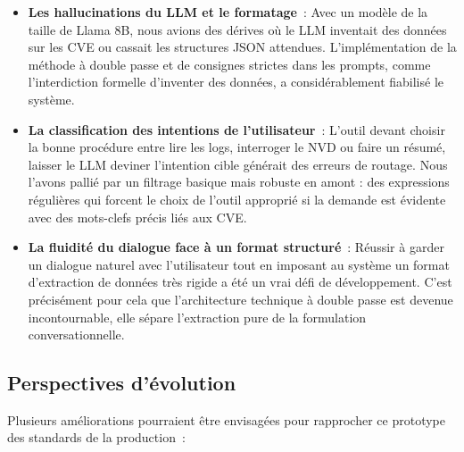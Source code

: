 \documentclass[runningheads]{llncs}
\begin{document}
\begin{itemize}
    \item \textbf{Les hallucinations du LLM et le formatage}~: Avec un modèle de la taille de Llama 8B, nous avions des dérives où le LLM inventait des données sur les CVE ou cassait les structures JSON attendues. L'implémentation de la méthode à double passe et de consignes strictes dans les prompts, comme l'interdiction formelle d'inventer des données, a considérablement fiabilisé le système.
    \item \textbf{La classification des intentions de l'utilisateur}~: L'outil devant choisir la bonne procédure entre lire les logs, interroger le NVD ou faire un résumé, laisser le LLM deviner l'intention cible générait des erreurs de routage. Nous l'avons pallié par un filtrage basique mais robuste en amont : des expressions régulières qui forcent le choix de l'outil approprié si la demande est évidente avec des mots-clefs précis liés aux CVE.
    \item \textbf{La fluidité du dialogue face à un format structuré}~: Réussir à garder un dialogue naturel avec l'utilisateur tout en imposant au système un format d'extraction de données très rigide a été un vrai défi de développement. C'est précisément pour cela que l'architecture technique à double passe est devenue incontournable, elle sépare l'extraction pure de la formulation conversationnelle.
\end{itemize}

\subsection{Perspectives d'évolution}

Plusieurs améliorations pourraient être envisagées pour rapprocher ce prototype des standards de la production~:
\end{document}
